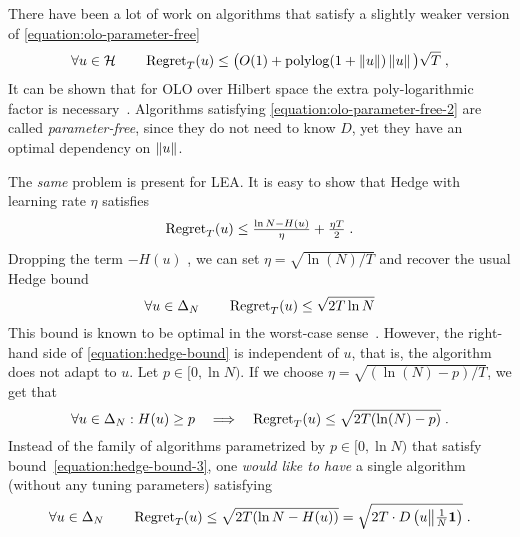 There have been a lot of work on algorithms
\citep{Streeter-McMahan-2012, Orabona-2013, McMahan-Abernethy-2013,
McMahan-Orabona-2014,Orabona-Pal-2016-parameter-free} that satisfy a slightly weaker version of
\eqref{equation:olo-parameter-free}
\begin{equation}
\label{equation:olo-parameter-free-2}
\forall u \in \mathcal{H} \qquad \operatorname{Regret}_T(u) \le \big(O(1)+\operatorname{polylog}(1 + \left\|{u}\right\|)\left\|{u}\right\| \big) \sqrt{T} \; ,
\end{equation}
It can be shown
that for \ac{OLO} over Hilbert space the extra poly-logarithmic factor is
necessary~\citep{McMahan-Abernethy-2013,Orabona-2013}. Algorithms satisfying
\eqref{equation:olo-parameter-free-2} are called \emph{parameter-free}, since
they do not need to know $D$, yet they have an optimal dependency on $\left\|{u}\right\|$.

The \emph{same} problem is present for \ac{LEA}.
It is easy to show that Hedge with learning rate $\eta$ satisfies
\begin{equation}
\label{equation:hedge-bound-2}
\operatorname{Regret}_T(u) \le \tfrac{\ln N - H(u)}{\eta} + \tfrac{\eta T}{2} \; .
\end{equation}
Dropping the term $-H(u)$ , we can set $\eta = \sqrt{\ln(N)/T}$ and recover the usual
Hedge bound~\citep{Freund-Schapire-1997}
\begin{equation}
\label{equation:hedge-bound}
\forall u \in \Delta_N \qquad \operatorname{Regret}_T(u) \le \sqrt{2 T \ln N}
\end{equation}
This bound is known to be optimal in the worst-case sense~\cite[Section
3.7]{Cesa-Bianchi-Lugosi-2006}. However, the right-hand side of
\eqref{equation:hedge-bound} is independent of $u$, that is, the algorithm does
not adapt to $u$.  Let $p \in [0, \ln N)$. If we choose $\eta = \sqrt{(\ln(N) -
p)/T}$, we get that
\begin{equation}
\label{equation:hedge-bound-3}
\forall u \in \Delta_N: H(u) \ge p \quad \Longrightarrow \quad \operatorname{Regret}_T(u) \le \sqrt{2 T (\ln(N) - p)} \; .
\end{equation}
Instead of the family of algorithms parametrized by $p \in [0,\ln N)$ that
satisfy bound~\eqref{equation:hedge-bound-3}, one \emph{would like to have} a single
algorithm (without any tuning parameters) satisfying
\begin{equation}
\label{equation:parameter-free-bound-experts}
\forall u \in \Delta_N \qquad \operatorname{Regret}_T(u) \le \sqrt{2 T (\ln N - H(u))} = \sqrt{2T \cdot D\left({u}\middle\|{\tfrac{1}{N} \mathbf{1}}\right)} \; .
\end{equation}
